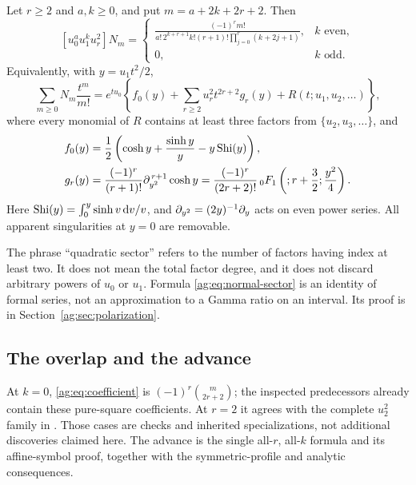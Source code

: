 \begin{theorem}\label{ag:thm:main}
Let $r\ge2$ and $a,k\ge0$, and put $m=a+2k+2r+2$. Then
\begin{equation}\label{ag:eq:coefficient}
 \boxed{
 [u_0^a u_1^k u_r^2]N_m=
 \begin{cases}
 \displaystyle
 \frac{(-1)^r m!}
 {a!\,2^{k+r+1}k!(r+1)!\prod_{j=0}^{r}(k+2j+1)},&k\text{ even},\\[7pt]
 0,&k\text{ odd}.
 \end{cases}}
\end{equation}
Equivalently, with $y=u_1t^2/2$,
\begin{equation}\label{ag:eq:normal-sector}
 \sum_{m\ge0}N_m\frac{t^m}{m!}
 =e^{tu_0}\left\{f_0(y)+\sum_{r\ge2}u_r^2t^{2r+2}g_r(y)
                          +R(t;u_1,u_2,\ldots)\right\},
\end{equation}
where every monomial of $R$ contains at least three factors from
$\{u_2,u_3,\ldots\}$, and
\begin{align}
 f_0(y)&=\frac12\left(\cosh y+\frac{\sinh y}{y}-y\operatorname{Shi}(y)\right),
       \label{ag:eq:f0-intro}\\
 g_r(y)&=\frac{(-1)^r}{(r+1)!}\partial_{y^2}^{\,r+1}\cosh y
 =\frac{(-1)^r}{(2r+2)!}\,{}_0F_1\left(;r+\frac32;\frac{y^2}{4}\right).
       \label{ag:eq:gr-intro}
\end{align}
Here $\operatorname{Shi}(y)=\int_0^y\sinh v\,\mathrm d v/v$, and
$\partial_{y^2}=(2y)^{-1}\partial_y$ acts on even power series. All apparent
singularities at $y=0$ are removable.
\end{theorem}

The phrase ``quadratic sector'' refers to the number of factors having
index at least two. It does not mean the total factor degree, and it does
not discard arbitrary powers of $u_0$ or $u_1$. Formula
\eqref{ag:eq:normal-sector} is an identity of formal series, not an
approximation to a Gamma ratio on an interval. Its proof is in
Section~\ref{ag:sec:polarization}.

\subsection{The overlap and the advance}

At $k=0$, \eqref{ag:eq:coefficient} is
$(-1)^r\binom{m}{2r+2}$; the inspected predecessors already contain
these pure-square coefficients. At $r=2$ it agrees with the complete
$u_2^2$ family in \cite[Section~4]{HTG}. Those cases are checks and
inherited specializations, not additional discoveries claimed here.
The advance is the single all-$r$, all-$k$ formula and its affine-symbol
proof, together with the symmetric-profile and analytic consequences.

